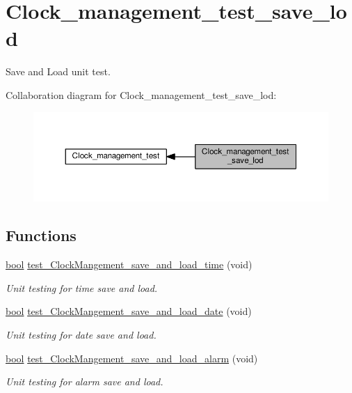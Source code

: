 \hypertarget{group__clock__management__test__save__lod}{}\section{Clock\+\_\+management\+\_\+test\+\_\+save\+\_\+lod}
\label{group__clock__management__test__save__lod}


Save and Load unit test.  


Collaboration diagram for Clock\+\_\+management\+\_\+test\+\_\+save\+\_\+lod\+:\nopagebreak
\begin{figure}[H]
\begin{center}
\leavevmode
\includegraphics[width=350pt]{dc/d9e/group__clock__management__test__save__lod}
\end{center}
\end{figure}
\subsection*{Functions}
\begin{DoxyCompactItemize}
\item 
\hyperlink{group___utils_gaf6a258d8f3ee5206d682d799316314b1}{bool} \hyperlink{group__clock__management__test__save__lod_gabfcdb446b5f81be9015c7fbfcf5bc6ca}{test\+\_\+\+Clock\+Mangement\+\_\+save\+\_\+and\+\_\+load\+\_\+time} (void)
\begin{DoxyCompactList}\small\item\em Unit testing for time save and load. \end{DoxyCompactList}\item 
\hyperlink{group___utils_gaf6a258d8f3ee5206d682d799316314b1}{bool} \hyperlink{group__clock__management__test__save__lod_gab680a4ff1b04e7eaec660ca2553eb353}{test\+\_\+\+Clock\+Mangement\+\_\+save\+\_\+and\+\_\+load\+\_\+date} (void)
\begin{DoxyCompactList}\small\item\em Unit testing for date save and load. \end{DoxyCompactList}\item 
\hyperlink{group___utils_gaf6a258d8f3ee5206d682d799316314b1}{bool} \hyperlink{group__clock__management__test__save__lod_ga4934e7961bb4a81e64dcd38a158dad04}{test\+\_\+\+Clock\+Mangement\+\_\+save\+\_\+and\+\_\+load\+\_\+alarm} (void)
\begin{DoxyCompactList}\small\item\em Unit testing for alarm save and load. \end{DoxyCompactList}\end{DoxyCompactItemize}


